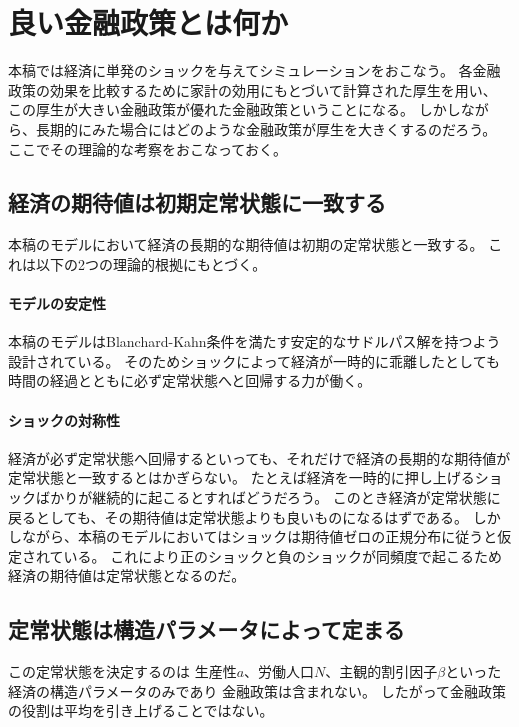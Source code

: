 
\section{良い金融政策とは何か}
\label{sec:chapter4_criteria}
本稿では経済に単発のショックを与えてシミュレーションをおこなう。
各金融政策の効果を比較するために家計の効用にもとづいて計算された厚生を用い、
この厚生が大きい金融政策が優れた金融政策ということになる。
しかしながら、長期的にみた場合にはどのような金融政策が厚生を大きくするのだろう。
ここでその理論的な考察をおこなっておく。

\subsection{経済の期待値は初期定常状態に一致する}
\label{sec:chapter4_criteria_expectation_value}
本稿のモデルにおいて経済の長期的な期待値は初期の定常状態と一致する。
これは以下の2つの理論的根拠にもとづく。

\paragraph{モデルの安定性}
\label{sec:chapter4_criteria_expectation_value_stability}
本稿のモデルはBlanchard-Kahn条件を満たす安定的なサドルパス解を持つよう設計されている。
そのためショックによって経済が一時的に乖離したとしても時間の経過とともに必ず定常状態へと回帰する力が働く。

\paragraph{ショックの対称性}
\label{sec:chapter4_criteria_expectation_value_symmetry}
経済が必ず定常状態へ回帰するといっても、それだけで経済の長期的な期待値が定常状態と一致するとはかぎらない。
たとえば経済を一時的に押し上げるショックばかりが継続的に起こるとすればどうだろう。
このとき経済が定常状態に戻るとしても、その期待値は定常状態よりも良いものになるはずである。
しかしながら、本稿のモデルにおいてはショックは期待値ゼロの正規分布に従うと仮定されている。
これにより正のショックと負のショックが同頻度で起こるため経済の期待値は定常状態となるのだ。

\subsection{定常状態は構造パラメータによって定まる}
\label{sec:chapter4_criteria_structure_parameters}
この定常状態を決定するのは
生産性\(a\)、労働人口\(N\)、主観的割引因子\(\beta\)といった経済の構造パラメータのみであり
金融政策は含まれない。
したがって金融政策の役割は平均を引き上げることではない。

